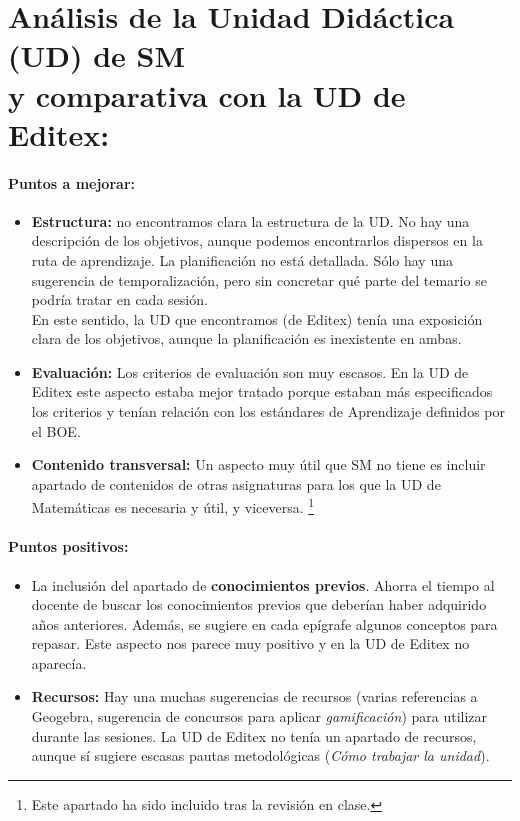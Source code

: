 \section{Análisis de la Unidad Didáctica (UD) de SM\\\quad\quad\small{y comparativa con la UD de Editex}:}


\paragraph{Puntos a mejorar:}


\begin{itemize}
\item \textbf{Estructura:} no encontramos clara la estructura de la UD.
	\subitem No hay una descripción de los objetivos, aunque podemos encontrarlos dispersos en la ruta de aprendizaje.
	\subitem La planificación no está detallada. Sólo hay una sugerencia de temporalización, pero sin concretar qué parte del temario se podría tratar en cada sesión. \\
En este sentido, la UD que encontramos (de Editex) tenía una exposición clara de los objetivos, aunque la planificación es inexistente en ambas.

\item \textbf{Evaluación:} Los criterios de evaluación son muy escasos. En la UD de Editex este aspecto estaba mejor tratado porque estaban más especificados los criterios y tenían relación con los estándares de Aprendizaje definidos por el BOE.

\item \textbf{Contenido transversal:} Un aspecto muy útil que SM no tiene es incluir apartado de contenidos de otras asignaturas para los que la UD de Matemáticas es necesaria y útil, y viceversa.
\footnote{Este apartado ha sido incluido tras la revisión en clase.}

\end{itemize}


\paragraph{Puntos positivos:}

\begin{itemize}
\item La inclusión del apartado de \textbf{conocimientos previos}. Ahorra el tiempo al docente de buscar los conocimientos previos que deberían haber adquirido años anteriores.
Además, se sugiere en cada epígrafe algunos conceptos para repasar.
Este aspecto nos parece muy positivo y en la UD de Editex no aparecía. 

\item \textbf{Recursos:} Hay una muchas sugerencias de recursos (varias referencias a Geogebra, sugerencia de concursos para aplicar \textit{gamificación}) para utilizar durante las sesiones.
La UD de Editex no tenía un apartado de recursos, aunque sí sugiere escasas pautas metodológicas (\textit{Cómo trabajar la unidad}).
\end{itemize}
